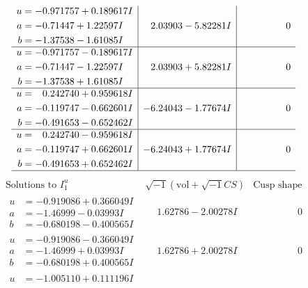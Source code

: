 \documentclass[1p]{elsarticle_modified}
\theoremstyle{definition}
\newcommand{\I}{\sqrt{-1}}
\begin{document}
$$\begin{array}{c|c|c}
\begin{aligned}
u &= -0.971757 + 0.189617 I \\
a &= -0.71447 + 1.22597 I \\
b &= -1.37538 - 1.61085 I\end{aligned}
 & \phantom{-}2.03903 - 5.82281 I & \phantom{-0.000000 } 0 \\ \hline\begin{aligned}
u &= -0.971757 - 0.189617 I \\
a &= -0.71447 - 1.22597 I \\
b &= -1.37538 + 1.61085 I\end{aligned}
 & \phantom{-}2.03903 + 5.82281 I & \phantom{-0.000000 } 0 \\ \hline\begin{aligned}
u &= \phantom{-}0.242740 + 0.959618 I \\
a &= -0.119747 - 0.662601 I \\
b &= -0.491653 - 0.652462 I\end{aligned}
 & -6.24043 - 1.77674 I & \phantom{-0.000000 } 0 \\ \hline\begin{aligned}
u &= \phantom{-}0.242740 - 0.959618 I \\
a &= -0.119747 + 0.662601 I \\
b &= -0.491653 + 0.652462 I\end{aligned}
 & -6.24043 + 1.77674 I & \phantom{-0.000000 } 0\\
 \hline 
 \end{array}$$\newpage$$\begin{array}{c|c|c}  
\text{Solutions to }I^u_{1}& \I (\text{vol} + \sqrt{-1}CS) & \text{Cusp shape}\\
 \hline 
\begin{aligned}
u &= -0.919086 + 0.366049 I \\
a &= -1.46999 - 0.03993 I \\
b &= -0.680198 - 0.400565 I\end{aligned}
 & \phantom{-}1.62786 - 2.00278 I & \phantom{-0.000000 } 0 \\ \hline\begin{aligned}
u &= -0.919086 - 0.366049 I \\
a &= -1.46999 + 0.03993 I \\
b &= -0.680198 + 0.400565 I\end{aligned}
 & \phantom{-}1.62786 + 2.00278 I & \phantom{-0.000000 } 0 \\ \hline\begin{aligned}
u &= -1.005110 + 0.111196 I \\

\end{aligned}
\end{array}$$
\end{document}
